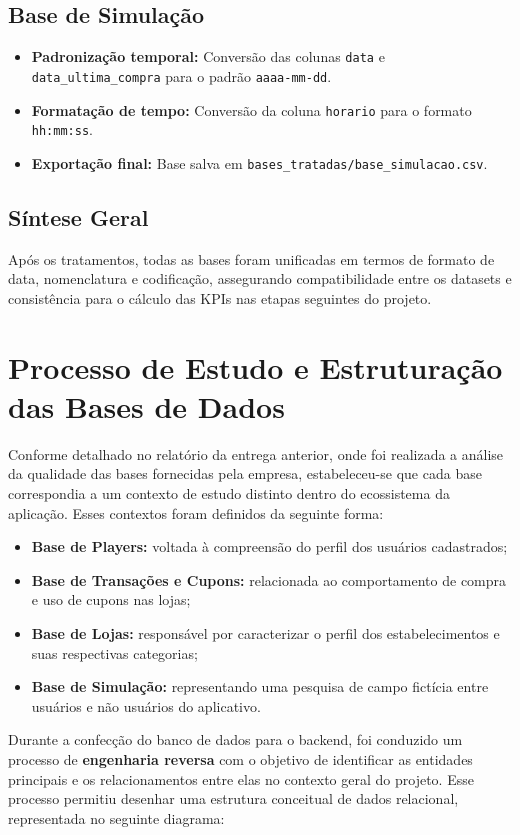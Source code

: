 \documentclass[12pt]{article}
\begin{document}
\subsection{Base de Simulação}
\begin{itemize}
    \item \textbf{Padronização temporal:} Conversão das colunas \texttt{data} e \texttt{data\_ultima\_compra} para o padrão \texttt{aaaa-mm-dd}.
    \item \textbf{Formatação de tempo:} Conversão da coluna \texttt{horario} para o formato \texttt{hh:mm:ss}.
    \item \textbf{Exportação final:} Base salva em \texttt{bases\_tratadas/base\_simulacao.csv}.
\end{itemize}

\subsection{Síntese Geral}
Após os tratamentos, todas as bases foram unificadas em termos de formato de data, nomenclatura e codificação, assegurando compatibilidade entre os datasets e consistência para o cálculo das KPIs nas etapas seguintes do projeto.

\section{Processo de Estudo e Estruturação das Bases de Dados}

Conforme detalhado no relatório da entrega anterior, onde foi realizada a análise da qualidade das bases fornecidas pela empresa, estabeleceu-se que cada base correspondia a um contexto de estudo distinto dentro do ecossistema da aplicação. Esses contextos foram definidos da seguinte forma:
\begin{itemize}
    \item \textbf{Base de Players:} voltada à compreensão do perfil dos usuários cadastrados;
    \item \textbf{Base de Transações e Cupons:} relacionada ao comportamento de compra e uso de cupons nas lojas;
    \item \textbf{Base de Lojas:} responsável por caracterizar o perfil dos estabelecimentos e suas respectivas categorias;
    \item \textbf{Base de Simulação:} representando uma pesquisa de campo fictícia entre usuários e não usuários do aplicativo.
\end{itemize}

Durante a confecção do banco de dados para o backend, foi conduzido um processo de \textbf{engenharia reversa} com o objetivo de identificar as entidades principais e os relacionamentos entre elas no contexto geral do projeto. Esse processo permitiu desenhar uma estrutura conceitual de dados relacional, representada no seguinte diagrama:
\end{document}
